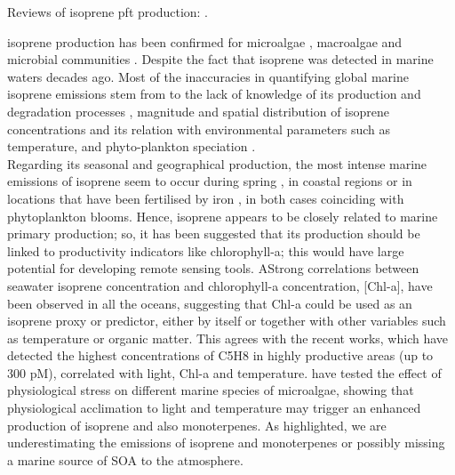 \documentclass[draft,linenumbers]{agujournal}
\begin{document}
Reviews of isoprene pft production: \citep{shaw2010production,exton2013chlorophyll,achyuthan2017volatile}.

isoprene \citep{bonsang1992evidence, broadgate1997seasonal} production has been confirmed for microalgae \citep{exton2013chlorophyll}, macroalgae \citep{broadgate2004isoprene} and microbial communities \citep{alvarez2009characterization}. Despite the fact that isoprene was detected in marine waters decades ago. Most of the inaccuracies in quantifying global marine isoprene emissions stem from to the lack of knowledge of its production and degradation processes \citep{ciuraru2015unravelling}, magnitude and spatial distribution of isoprene concentrations \citep{ooki2015global} and its relation with environmental parameters such as temperature, and phyto-plankton speciation \citep{carpenter2012ocean, exton2013chlorophyll}.\\

Regarding its seasonal and geographical production, the most intense marine emissions of isoprene seem to occur during spring \citep{liakakou2007isoprene}, in coastal regions \citep{ooki2015global} or in locations that have been fertilised by iron \citep{wingenter2004changing, moore2006methyl}, in both cases coinciding with phytoplankton blooms. Hence, isoprene appears to be closely related to marine primary production; so, it has been suggested that its production should be linked to productivity indicators like chlorophyll-a; this would have large potential for developing remote sensing tools. AStrong correlations between seawater isoprene concentration and chlorophyll-a concentration, [Chl-a], have been observed in all the oceans\citep{bonsang1992evidence, broadgate1997seasonal, shaw2003isoprene}, suggesting that Chl-a could be used as an isoprene proxy or predictor, either by itself or together with other variables such as temperature or organic matter. This agrees with the recent works\citep{ooki2015global,li2017distribution}, which have detected the highest concentrations of C5H8 in highly productive areas (up to 300 pM), correlated with light, Chl-a and temperature. \citep{meskhidze2015quantifying} have tested the effect of physiological stress on different marine species of microalgae, showing that  physiological acclimation to light and temperature may trigger an enhanced production of isoprene and also monoterpenes. As \citep{heald2005large} highlighted, we are underestimating the emissions of isoprene and monoterpenes or possibly missing a marine source of SOA to the atmosphere.\\
\end{document}
